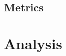 \documentclass[a4paper,10pt]{article}
\begin{document}




\subsection{Metrics}

\section{Analysis}
\end{document}
